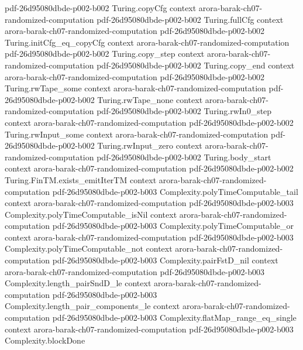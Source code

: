 \begin{theorem}
  {pdf-26d95080dbde-p002-b002}
\proofstep
  {Turing.copyCfg}
  {context}
  {arora-barak-ch07-randomized-computation}
  {pdf-26d95080dbde-p002-b002}
\proofstep
  {Turing.fullCfg}
  {context}
  {arora-barak-ch07-randomized-computation}
  {pdf-26d95080dbde-p002-b002}
\proofstep
  {Turing.initCfg_eq_copyCfg}
  {context}
  {arora-barak-ch07-randomized-computation}
  {pdf-26d95080dbde-p002-b002}
\proofstep
  {Turing.copy_step}
  {context}
  {arora-barak-ch07-randomized-computation}
  {pdf-26d95080dbde-p002-b002}
\proofstep
  {Turing.copy_end}
  {context}
  {arora-barak-ch07-randomized-computation}
  {pdf-26d95080dbde-p002-b002}
\proofstep
  {Turing.rwTape_some}
  {context}
  {arora-barak-ch07-randomized-computation}
  {pdf-26d95080dbde-p002-b002}
\proofstep
  {Turing.rwTape_none}
  {context}
  {arora-barak-ch07-randomized-computation}
  {pdf-26d95080dbde-p002-b002}
\proofstep
  {Turing.rwIn0_step}
  {context}
  {arora-barak-ch07-randomized-computation}
  {pdf-26d95080dbde-p002-b002}
\proofstep
  {Turing.rwInput_some}
  {context}
  {arora-barak-ch07-randomized-computation}
  {pdf-26d95080dbde-p002-b002}
\proofstep
  {Turing.rwInput_zero}
  {context}
  {arora-barak-ch07-randomized-computation}
  {pdf-26d95080dbde-p002-b002}
\proofstep
  {Turing.body_start}
  {context}
  {arora-barak-ch07-randomized-computation}
  {pdf-26d95080dbde-p002-b002}
\proofstep
  {Turing.FinTM.exists_emitIterTM}
  {context}
  {arora-barak-ch07-randomized-computation}
  {pdf-26d95080dbde-p002-b003}
\proofstep
  {Complexity.polyTimeComputable_tail}
  {context}
  {arora-barak-ch07-randomized-computation}
  {pdf-26d95080dbde-p002-b003}
\proofstep
  {Complexity.polyTimeComputable_isNil}
  {context}
  {arora-barak-ch07-randomized-computation}
  {pdf-26d95080dbde-p002-b003}
\proofstep
  {Complexity.polyTimeComputable_or}
  {context}
  {arora-barak-ch07-randomized-computation}
  {pdf-26d95080dbde-p002-b003}
\proofstep
  {Complexity.polyTimeComputable_not}
  {context}
  {arora-barak-ch07-randomized-computation}
  {pdf-26d95080dbde-p002-b003}
\proofstep
  {Complexity.pairFstD_nil}
  {context}
  {arora-barak-ch07-randomized-computation}
  {pdf-26d95080dbde-p002-b003}
\proofstep
  {Complexity.length_pairSndD_le}
  {context}
  {arora-barak-ch07-randomized-computation}
  {pdf-26d95080dbde-p002-b003}
\proofstep
  {Complexity.length_pair_components_le}
  {context}
  {arora-barak-ch07-randomized-computation}
  {pdf-26d95080dbde-p002-b003}
\proofstep
  {Complexity.flatMap_range_eq_single}
  {context}
  {arora-barak-ch07-randomized-computation}
  {pdf-26d95080dbde-p002-b003}
\proofstep
  {Complexity.blockDone}

\end{theorem}
